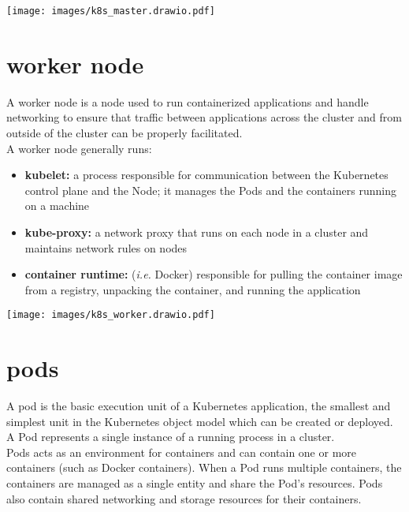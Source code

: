 \documentclass{refcard}
\begin{document}
\begin{center}
    \texttt{[image: images/k8s\_master.drawio.pdf]}
\end{center}

\section{worker node}

A worker node is a node used to run containerized applications and handle networking to ensure that traffic between applications across the cluster and from outside of the cluster can be properly facilitated.\\

A worker node generally runs:
\begin{itemize}
    \item \textbf{kubelet:} a process responsible for communication between the Kubernetes control plane and the Node; it manages the Pods and the containers running on a machine
    \item \textbf{kube-proxy:} a network proxy that runs on each node in a cluster and maintains network rules on nodes
    \item \textbf{container runtime:} (\textit{i.e.} Docker) responsible for pulling the container image from a registry, unpacking the container, and running the application
\end{itemize}
\begin{center}
    \texttt{[image: images/k8s\_worker.drawio.pdf]}
\end{center}

\section{pods}

A pod is the basic execution unit of a Kubernetes application, the smallest and simplest unit in the Kubernetes object model which can be created or deployed. A Pod represents a single instance of a running process in a cluster.\\

Pods acts as an environment for containers and can contain one or more containers (such as Docker containers). When a Pod runs multiple containers, the containers are managed as a single entity and share the Pod's resources. Pods also contain shared networking and storage resources for their containers.\\
\end{document}
